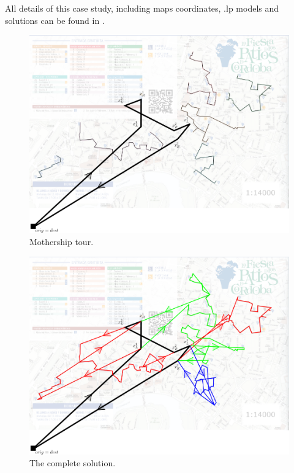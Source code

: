 All details of this case study, including maps coordinates, .lp models and solutions can be found in \cite{Puerto2021}.


\begin{figure}[h!]
\centering
\includegraphics[width=0.6\linewidth]{figures/second.png}
\caption{Mothership tour. \label{fig:Mtour}}
\end{figure}

\begin{figure}[h!]
\centering
\includegraphics[width=0.6\linewidth]{figures/third.png}
\caption{The complete solution. \label{fig:tourD}}
\end{figure}